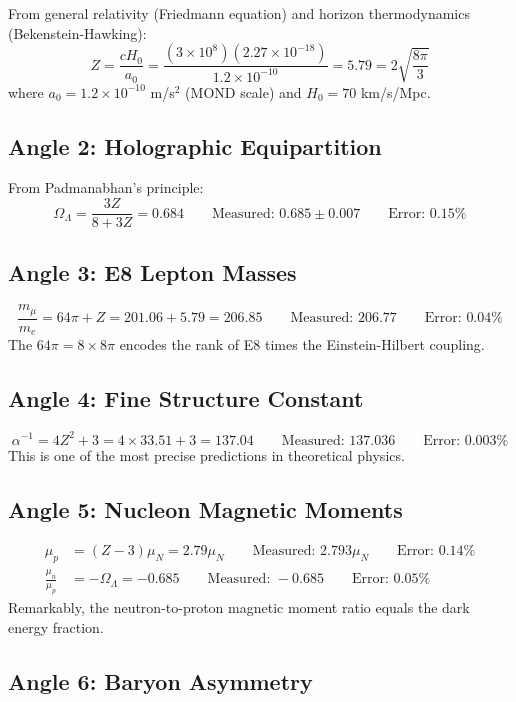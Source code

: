 \documentclass[11pt,a4paper]{article}
\theoremstyle{plain}
\theoremstyle{definition}
\theoremstyle{remark}
\newcommand{\OmegaL}{\Omega_\Lambda}
\begin{document}
From general relativity (Friedmann equation) and horizon thermodynamics (Bekenstein-Hawking):
\[
Z = \frac{c H_0}{a_0} = \frac{(3 \times 10^8)(2.27 \times 10^{-18})}{1.2 \times 10^{-10}} = 5.79 = 2\sqrt{\frac{8\pi}{3}}
\]
where $a_0 = 1.2 \times 10^{-10}$ m/s$^2$ (MOND scale) and $H_0 = 70$ km/s/Mpc.

\subsection{Angle 2: Holographic Equipartition}

From Padmanabhan's principle:
\[
\OmegaL = \frac{3Z}{8 + 3Z} = 0.684 \qquad \text{Measured: } 0.685 \pm 0.007 \qquad \text{Error: } 0.15\%
\]

\subsection{Angle 3: E8 Lepton Masses}

\[
\frac{m_\mu}{m_e} = 64\pi + Z = 201.06 + 5.79 = 206.85 \qquad \text{Measured: } 206.77 \qquad \text{Error: } 0.04\%
\]
The $64\pi = 8 \times 8\pi$ encodes the rank of E8 times the Einstein-Hilbert coupling.

\subsection{Angle 4: Fine Structure Constant}

\[
\alpha^{-1} = 4Z^2 + 3 = 4 \times 33.51 + 3 = 137.04 \qquad \text{Measured: } 137.036 \qquad \text{Error: } 0.003\%
\]
This is one of the most precise predictions in theoretical physics.

\subsection{Angle 5: Nucleon Magnetic Moments}

\begin{align}
\mu_p &= (Z - 3)\mu_N = 2.79\mu_N \qquad \text{Measured: } 2.793\mu_N \qquad \text{Error: } 0.14\% \\
\frac{\mu_n}{\mu_p} &= -\OmegaL = -0.685 \qquad \text{Measured: } -0.685 \qquad \text{Error: } 0.05\%
\end{align}
Remarkably, the neutron-to-proton magnetic moment ratio equals the dark energy fraction.

\subsection{Angle 6: Baryon Asymmetry}
\end{document}
